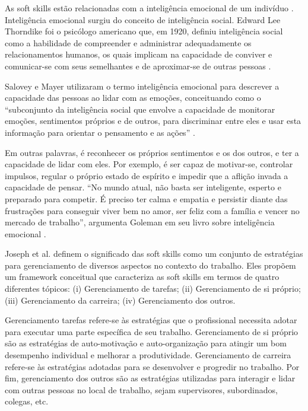 As soft skills estão relacionadas com a inteligência emocional de um indivíduo \cite{hjyunus:12}. Inteligência emocional surgiu do conceito de inteligência social. Edward Lee Thorndike foi o psicólogo americano que, em 1920, definiu inteligência social como a habilidade de compreender e administrar adequadamente os relacionamentos humanos, os quais implicam na capacidade de conviver e comunicar-se com seus semelhantes e de aproximar-se de outras pessoas \cite{thornlike:20}.

Salovey e Mayer utilizaram o termo inteligência emocional para descrever a capacidade das pessoas ao lidar com as emoções, conceituando como o ``subconjunto da inteligência social que envolve a capacidade de monitorar emoções, sentimentos próprios e de outros, para discriminar entre eles e usar esta informação para orientar o pensamento e as ações'' \cite{salovey:90}.

Em outras palavras, é reconhecer os próprios sentimentos e os dos outros, e ter a capacidade de lidar com eles. Por exemplo, é ser capaz de motivar-se, controlar impulsos, regular o próprio estado de espírito e impedir que a aflição invada a capacidade de pensar. ``No mundo atual, não basta ser inteligente, esperto e preparado para competir. É preciso ter calma e empatia e persistir diante das frustrações para conseguir viver bem no amor, ser feliz com a família e vencer no mercado de trabalho'', argumenta Goleman em seu livro sobre inteligência emocional \cite{goleman:07}.

Joseph et al. \cite{joseph:99} \cite{joseph:10} definem o significado das soft skills como um conjunto de estratégias para gerenciamento de diversos aspectos no contexto do trabalho. Eles propõem um framework conceitual que caracteriza as soft skills em termos de quatro diferentes tópicos: (i) Gerenciamento de tarefas; (ii) Gerenciamento de si próprio; (iii) Gerenciamento da carreira; (iv) Gerenciamento dos outros.

Gerenciamento tarefas refere-se às estratégias que o profissional necessita adotar para executar uma parte específica de seu trabalho. Gerenciamento de si próprio são as estratégias de auto-motivação e auto-organização para atingir um bom desempenho individual e melhorar a produtividade. Gerenciamento de carreira refere-se às estratégias adotadas para se desenvolver e progredir no trabalho. Por fim, gerenciamento dos outros são as estratégias utilizadas para interagir e lidar com outras pessoas no local de trabalho, sejam supervisores, subordinados, colegas, etc.

